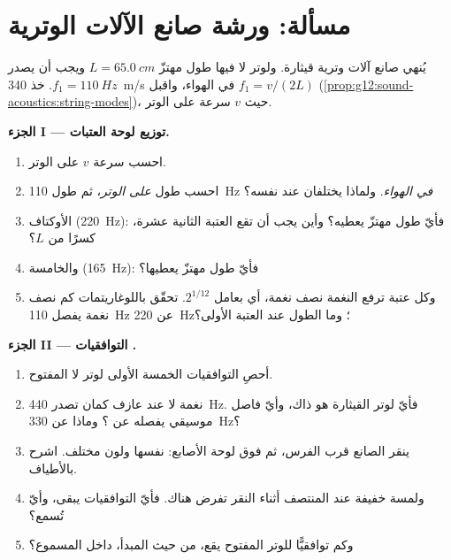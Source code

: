 \section{مسألة: ورشة صانع الآلات الوترية}

\begin{problem}
\label{pb:g12:sound-acoustics:1}
يُنهي صانع آلات وترية قيثارة. ولوتر لا فيها طول مهتزّ
$L = \qty{65.0}{cm}$ ويجب أن يصدر $f_1 = \qty{110}{Hz}$. خذ
\qty{340}{m/s}  في الهواء، واقبل $f_1 = v/(2L)$
(\cref{prop:g12:sound-acoustics:string-modes})، حيث $v$ سرعة
 على الوتر.

\medskip
\noindent\textbf{الجزء I --- توزيع لوحة العتبات.}
\begin{enumerate}
  \item احسب سرعة  $v$ على الوتر.
  \item احسب طول   \emph{على الوتر}،
        ثم طول   \qty{110}{Hz} \emph{في
        الهواء}. ولماذا يختلفان عند  نفسه؟
  \item الأوكتاف (\qty{220}{Hz}): فأيّ طول مهتزّ يعطيه؟
        وأين يجب أن تقع العتبة الثانية عشرة، كسرًا من $L$؟
  \item والخامسة (\qty{165}{Hz}): فأيّ طول مهتزّ يعطيها؟
  \item وكل عتبة ترفع النغمة نصف نغمة، أي بعامل
        $2^{1/12}$. تحقّق باللوغاريتمات كم نصف نغمة يفصل
        \qty{110}{Hz} عن \qty{220}{Hz}؛ وما الطول عند العتبة الأولى؟
\end{enumerate}

\medskip
\noindent\textbf{الجزء II --- التوافقيات .}
\begin{enumerate}[resume]
  \item أحصِ التوافقيات الخمسة الأولى لوتر لا المفتوح.
  \item نغمة لا عند عازف كمان تصدر \qty{440}{Hz}. فأيّ  لوتر
        القيثارة هو ذاك، وأيّ فاصل موسيقي يفصله
        عن ؟ وماذا عن \qty{330}{Hz}؟
  \item ينقر الصانع قرب الفرس، ثم فوق لوحة
        الأصابع:  نفسها ولون مختلف. اشرح بالأطياف.
  \item ولمسة خفيفة عند المنتصف أثناء النقر تفرض 
        هناك. فأيّ التوافقيات يبقى، وأيّ  تُسمع؟
  \item وكم توافقيًّا للوتر المفتوح يقع، من حيث المبدأ،
        داخل  المسموع؟
\end{enumerate}


\end{problem}
